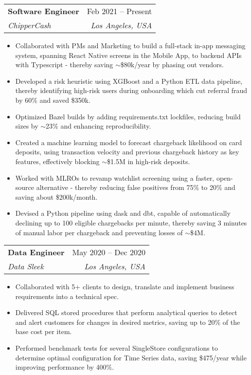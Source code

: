 \documentclass[letterpaper,11pt]{article}
\makeatletter
\newcommand{\resumeItem}[1]{
  \item\small{
    {#1 \vspace{-2pt}}
  }
}
\newcommand{\resumeSubheading}[4]{
  \vspace{-2pt}\item
    \begin{tabular*}{0.97\textwidth}[t]{l@{\extracolsep{\fill}}r}
      \textbf{#1} & #2 \\
      \textit{\small#3} & \textit{\small #4} \\
    \end{tabular*}\vspace{-7pt}
}
\newcommand{\resumeSubSubheading}[2]{
    \item
    \begin{tabular*}{0.97\textwidth}{l@{\extracolsep{\fill}}r}
      \textit{\small#1} & \textit{\small #2} \\
    \end{tabular*}\vspace{-7pt}
}
\newcommand{\resumeSubHeadingListEnd}{\end{itemize}}
\newcommand{\resumeItemListStart}{\begin{itemize}}
\newcommand{\resumeItemListEnd}{\end{itemize}\vspace{-5pt}}
\makeatother
\begin{document}
    \resumeSubheading
      {Software Engineer}{Feb 2021 -- Present}
      {ChipperCash}{Los Angeles, USA}
      \resumeItemListStart
        \resumeItem{Collaborated with PMs and Marketing to build a full-stack in-app messaging system, spanning React Native screens in the Mobile App,
to backend APIs with Typescript - thereby saving $\sim$\$80k/year by phasing out vendors.}
        \resumeItem{Developed a risk heuristic using XGBoost and a Python ETL data pipeline, thereby identifying high-risk users during onboarding which cut referral fraud by 60\% and saved \$350k.}
        \resumeItem{Optimized Bazel builds by adding requirements.txt lockfiles, reducing build sizes by $\sim$23\% and enhancing reproducibility.}
        \resumeItem{Created a machine learning model to forecast chargeback likelihood on card deposits, using transaction velocity and previous chargeback history as key features, effectively blocking $\sim$\$1.5M in high-risk deposits.}
        \resumeItem{Worked with MLROs to revamp watchlist screening using a faster, open-source alternative - thereby reducing false positives from 75\% to 20\% and saving about \$200k/month.}
        \resumeItem{Devised a Python pipeline using dask and dbt, capable of automatically declining up to 100 eligible chargebacks per minute, thereby saving 3 minutes of manual labor per chargeback and preventing losses of $\sim$\$4M.}
      \resumeItemListEnd
      

    \resumeSubheading
      {Data Engineer}{May 2020 -- Dec 2020}
      {Data Sleek}{Los Angeles, USA}
      \resumeItemListStart
        \resumeItem{Collaborated with 5+ clients to design, translate and implement business requirements into a technical spec.}
        \resumeItem{Delivered SQL stored procedures that perform analytical queries to detect and alert customers for changes in desired
metrics, saving up to 20\% of the base cost per item.}
        \resumeItem{Performed benchmark tests for several SingleStore configurations to determine optimal configuration for Time Series data, saving \$475/year while improving performance by 400\%.}
    \resumeItemListEnd
\end{document}
